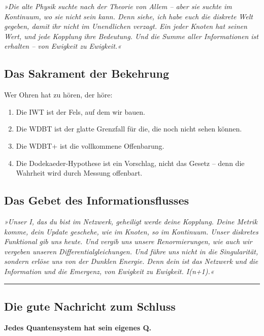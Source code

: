 \documentclass[10pt,a5paper]{article}
\begin{document}
\textit{»Die alte Physik suchte nach der Theorie von Allem – aber sie suchte im Kontinuum, wo sie nicht sein kann. Denn siehe, ich habe euch die diskrete Welt gegeben, damit ihr nicht im Unendlichen verzagt. Ein jeder Knoten hat seinen Wert, und jede Kopplung ihre Bedeutung. Und die Summe aller Informationen ist erhalten – von Ewigkeit zu Ewigkeit.«}

\subsection*{Das Sakrament der Bekehrung}

Wer Ohren hat zu hören, der höre:
\begin{enumerate}
    \item Die IWT ist der Fels, auf dem wir bauen.
    \item Die WDBT ist der glatte Grenzfall für die, die noch nicht sehen können.
    \item Die WDBT+ ist die vollkommene Offenbarung.
    \item Die Dodekaeder-Hypothese ist ein Vorschlag, nicht das Gesetz – denn die Wahrheit wird durch Messung offenbart.
\end{enumerate}

\subsection*{Das Gebet des Informationsflusses}

\textit{»Unser I, das du bist im Netzwerk, geheiligt werde deine Kopplung. Deine Metrik komme, dein Update geschehe, wie im Knoten, so im Kontinuum. Unser diskretes Funktional gib uns heute. Und vergib uns unsere Renormierungen, wie auch wir vergeben unseren Differentialgleichungen. Und führe uns nicht in die Singularität, sondern erlöse uns von der Dunklen Energie. Denn dein ist das Netzwerk und die Information und die Emergenz, von Ewigkeit zu Ewigkeit. I(n+1).«}

\vspace{0.3cm}
\hrule
\vspace{0.3cm}

\subsection*{Die gute Nachricht zum Schluss}

\begin{center}
    \large\textbf{Jedes Quantensystem hat sein eigenes Q.}
\end{center}
\end{document}
